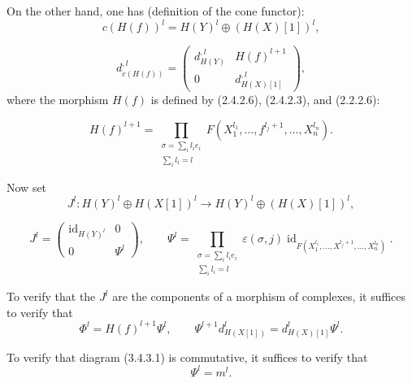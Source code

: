 \clearpage
{}%
\begingroup
\small
\setlength{\abovedisplayskip}{3pt plus 2pt minus 2pt}%
\setlength{\belowdisplayskip}{3pt plus 2pt minus 2pt}%
\setlength{\jot}{2pt}%

On the other hand, one has (definition of the cone functor):
\[
  c(H(f))^l=H(Y)^l\oplus(H(X)[1])^l,
\]

\begin{equation}
  d_{c(H(f))}^{,l}=
  \begin{pmatrix}
    d_{H(Y)}^{,l} & H(f)^{l+1}\\
    0 & d_{H(X)[1]}^{,l}
  \end{pmatrix},
  \tag{3.4.3.4}
\end{equation}
where the morphism $H(f)$ is defined by (2.4.2.6), (2.4.2.3), and
(2.2.2.6):

\begin{equation}
  H(f)^{l+1}=
  \prod_{\substack{\sigma=\sum_i l_i e_i\\ \sum_i l_i=l}}
  F(X_1^{l_1},\ldots,f^{l_j+1},\ldots,X_n^{l_n}).
  \tag{3.4.3.5}
\end{equation}

Now set
\[
  J^l\colon H(Y)^l\oplus H(X[1])^l
  \longrightarrow H(Y)^l\oplus(H(X)[1])^l,
\]

\begin{equation}
  J^l=
  \begin{pmatrix}
    \operatorname{id}_{H(Y)^l} & 0\\
    0 & \Psi^l
  \end{pmatrix},
  \qquad
  \Psi^l=
  \prod_{\substack{\sigma=\sum_i l_i e_i\\ \sum_i l_i=l}}
  \varepsilon(\sigma,j)
  \operatorname{id}_{F(X_1^{l_1},\ldots,X^{l_j+1},\ldots,X_n^{l_n})}.
  \tag{3.4.3.6}
\end{equation}

To verify that the $J^l$ are the components of a morphism of complexes, it
suffices to verify that
\begin{equation}
  \Phi^l=H(f)^{l+1}\Psi^l,
  \qquad
  \Psi^{l+1}d_{H(X[1])}^{l}=d_{H(X)[1]}^{l}\Psi^l.
  \tag{3.4.3.7}
\end{equation}

To verify that diagram (3.4.3.1) is commutative, it suffices to verify that
\begin{equation}
  \Psi^l=m^l.
  \tag{3.4.3.8}
\end{equation}
\endgroup
